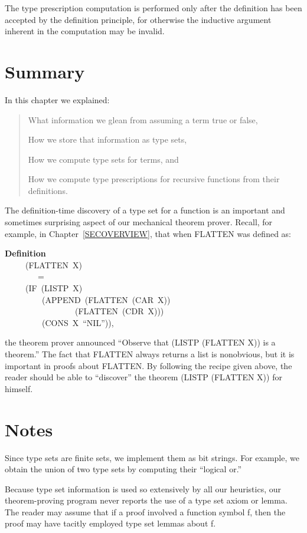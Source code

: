 \documentclass[10pt]{book}
\newenvironment{pubasis}{\begin{flushleft}}{\end{flushleft}}
\newenvironment{pubcrown}{\begin{quote}}{\end{quote}}
\newcommand{\axiomordefinition}[1]{\vspace{6pt}\Large\textsf{\textbf{#1}}\normalsize}
\begin{document}
The type prescription computation is performed only after the
definition has been accepted  by the definition principle, for
otherwise the inductive argument inherent in the  computation
may be invalid.

\section{Summary}
In this chapter we explained:
\begin{pubcrown}
What information we glean from assuming a term true or false,

How we store that information as type sets,

How we compute type sets for terms, and

How we compute type prescriptions for recursive functions from
their definitions.
\end{pubcrown}
The definition-time discovery of a type set for a function
is an important and sometimes surprising aspect of our mechanical
theorem prover.  Recall, for example, in Chapter~\ref{SECOVERVIEW}, that when
FLATTEN was defined as:
\begin{pubasis}
\axiomordefinition{Definition}\\
~~~~~(FLATTEN~X)\\
~~~~~~~~=\\
~~~~~(IF~(LISTP~X)\\
~~~~~~~~~(APPEND~(FLATTEN~(CAR~X))\\
~~~~~~~~~~~~~~~~~(FLATTEN~(CDR~X)))\\
~~~~~~~~~(CONS~X~``NIL'')),\\
\end{pubasis}
the theorem prover announced ``Observe that (LISTP (FLATTEN X)) is a
theorem.''  The fact that FLATTEN always returns a list is nonobvious, but
it is important in proofs about FLATTEN.  By following the recipe
given above, the reader should be able to ``discover'' the theorem
(LISTP (FLATTEN X)) for himself.

\section{Notes}
Since type sets are finite sets, we implement them as bit strings.
For example, we obtain the union of two type sets by computing
their ``logical or.''

Because type set information is used so extensively by all our heuristics,
our theorem-proving program never reports the use of a type set axiom
or lemma.  The reader may assume that if a proof involved a function
symbol f, then the proof may have tacitly employed type set lemmas about f.
\end{document}
